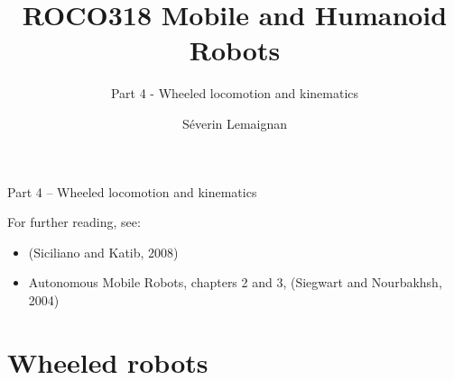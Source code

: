 \documentclass[compress]{beamer}
\title{ROCO318 \newline Mobile and Humanoid Robots}
\subtitle{Part 4 - Wheeled locomotion and kinematics}
\date{}
\author{Séverin Lemaignan}
\institute{Centre for Neural Systems and Robotics\\{\bf Plymouth University}}
\begin{document}

\maketitle

\begin{frame}{Part 4 -- Wheeled locomotion and kinematics}

For further reading, see:
    
    \begin{itemize}
        \item (Siciliano and Katib, 2008)
        \item Autonomous Mobile Robots, chapters 2 and 3, (Siegwart and Nourbakhsh, 2004)
    \end{itemize}
\end{frame}

\section{Wheeled robots}
\end{document}
